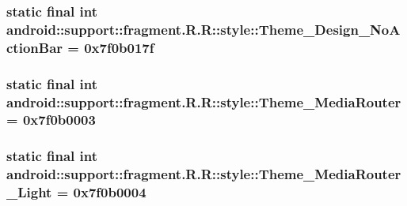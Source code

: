 \hypertarget{classandroid_1_1support_1_1fragment_1_1_r_1_1style_57f8a0dc505cf5edc2b3b7487f54f380}{
\subsubsection[{Theme\_\-Design\_\-NoActionBar}]{\setlength{\rightskip}{0pt plus 5cm}static final int android::support::fragment.R.R::style::Theme\_\-Design\_\-NoActionBar = 0x7f0b017f}}
\label{classandroid_1_1support_1_1fragment_1_1_r_1_1style_57f8a0dc505cf5edc2b3b7487f54f380}


\hypertarget{classandroid_1_1support_1_1fragment_1_1_r_1_1style_ac7f6069b6cf7af3a72ca068581decc1}{
\subsubsection[{Theme\_\-MediaRouter}]{\setlength{\rightskip}{0pt plus 5cm}static final int android::support::fragment.R.R::style::Theme\_\-MediaRouter = 0x7f0b0003}}
\label{classandroid_1_1support_1_1fragment_1_1_r_1_1style_ac7f6069b6cf7af3a72ca068581decc1}


\hypertarget{classandroid_1_1support_1_1fragment_1_1_r_1_1style_3f3f08dad69389287420b4699d6681f4}{
\subsubsection[{Theme\_\-MediaRouter\_\-Light}]{\setlength{\rightskip}{0pt plus 5cm}static final int android::support::fragment.R.R::style::Theme\_\-MediaRouter\_\-Light = 0x7f0b0004}}
\label{classandroid_1_1support_1_1fragment_1_1_r_1_1style_3f3f08dad69389287420b4699d6681f4}


